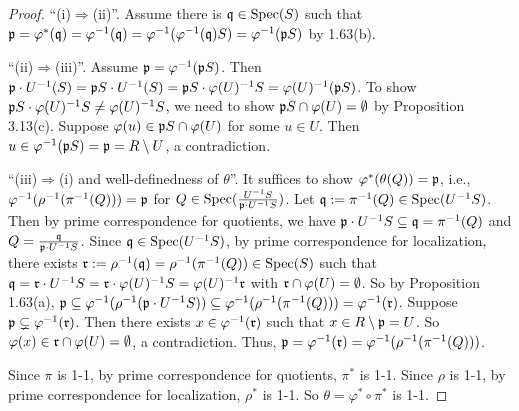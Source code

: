\begin{proof}
    ``(i)$\Rightarrow$(ii)''. Assume there is $\mathfrak{q} \in \operatorname{Spec}(S)$ such that $\mathfrak{p} = \varphi^*(\mathfrak{q}) = \varphi^{-1}(\mathfrak{q}) = \varphi^{-1}(\varphi^{-1}(\mathfrak{q})S) = \varphi^{-1}(\mathfrak{p} S)$ by 1.63(b). \par 
    ``(ii)$\Rightarrow$(iii)''. Assume $\mathfrak{p} = \varphi^{-1}(\mathfrak{p} S)$. Then $\mathfrak{p} \cdot U^{-1}(S) = \mathfrak{p} S \cdot U^{-1}(S) = \mathfrak{p} S \cdot \varphi(U)^{-1}S = \varphi(U)^{-1} (\mathfrak{p} S)$. To show $\mathfrak{p} S \cdot \varphi(U)^{-1}S \neq \varphi(U)^{-1}S$, we need to show $\mathfrak{p} S \cap \varphi(U) = \emptyset$ by Proposition 3.13(c). Suppose $\varphi(u) \in \mathfrak{p} S \cap \varphi(U)$ for some $u \in U$. Then $u \in \varphi^{-1}(\mathfrak{p} S) = \mathfrak{p} = R \setminus U$, a contradiction. \par 
    ``(iii)$\Rightarrow$(i) and well-definedness of $\theta$''. It suffices to show $\varphi^{*}(\theta(Q)) = \mathfrak{p}$, i.e., $\varphi^{-1}(\rho^{-1}(\pi^{-1}(Q))) = \mathfrak{p}$ for $Q \in \operatorname{Spec}(\frac{U^{-1}S}{\mathfrak{p} \cdot U^{-1}S})$. Let $\mathfrak{q} := \pi^{-1}(Q) \in \operatorname{Spec}(U^{-1}S)$. Then by prime correspondence for quotients, we have $\mathfrak{p} \cdot U^{-1} S \subseteq \mathfrak{q} = \pi^{-1}(Q)$ and $Q = \frac{\mathfrak{q}}{\mathfrak{p} \cdot U^{-1}S}$. Since $\mathfrak{q} \in \operatorname{Spec}(U^{-1}S)$, by prime correspondence for localization, there exists $\mathfrak{r} := \rho^{-1}(\mathfrak{q}) = \rho^{-1}(\pi^{-1}(Q)) \in \operatorname{Spec}(S)$ such that $\mathfrak{q} = \mathfrak{r} \cdot U^{-1}S = \mathfrak{r} \cdot \varphi(U)^{-1}S = \varphi(U)^{-1}\mathfrak{r}$ with $\mathfrak{r} \cap \varphi(U) = \emptyset$. So by Proposition 1.63(a), $\mathfrak{p} \subseteq \varphi^{-1}(\rho^{-1}(\mathfrak{p} \cdot U^{-1}S)) \subseteq \varphi^{-1}(\rho^{-1}(\pi^{-1}(Q))) = \varphi^{-1}(\mathfrak{r})$. Suppose $\mathfrak{p} \subsetneq \varphi^{-1}(\mathfrak{r})$. Then there exists $x \in \varphi^{-1}(\mathfrak{r})$ such that $x \in R \setminus \mathfrak{p} = U$. So $\varphi(x) \in \mathfrak{r} \cap \varphi(U) = \emptyset$, a contradiction. Thus, $\mathfrak{p} = \varphi^{-1}(\mathfrak{r}) = \varphi^{-1}(\rho^{-1}(\pi^{-1}(Q)))$. \par 
    Since $\pi$ is 1-1, by prime correspondence for quotients, $\pi^{*}$ is 1-1. Since $\rho$ is 1-1, by prime correspondence for localization, $\rho^{*}$ is 1-1. So $\theta = \varphi^* \circ \pi^{*}$ is 1-1. \par 

\end{proof}
